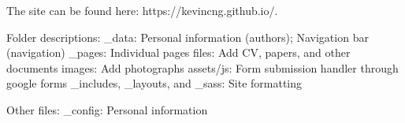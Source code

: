The site can be found here: https://kevincng.github.io/.

Folder descriptions:
_data: Personal information (authors); Navigation bar (navigation)
_pages: Individual pages
files: Add CV, papers, and other documents
images: Add photographs
assets/js: Form submission handler through google forms
_includes, _layouts, and _sass: Site formatting

Other files:
_config: Personal information